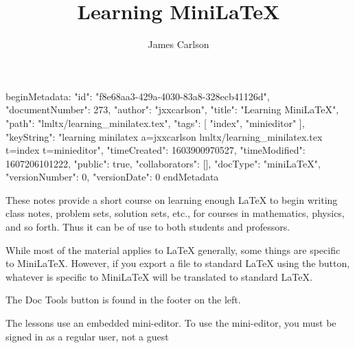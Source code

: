 beginMetadata:
{
    "id": "f8e68aa3-429a-4030-83a8-328ecb41126d",
    "documentNumber": 273,
    "author": "jxxcarlson",
    "title": "Learning MiniLaTeX",
    "path": "lmltx/learning_minilatex.tex",
    "tags": [
        "index",
        "minieditor"
    ],
    "keyString": "learning minilatex a=jxxcarlson lmltx/learning_minilatex.tex t=index t=minieditor",
    "timeCreated": 1603900970527,
    "timeModified": 1607206101222,
    "public": true,
    "collaborators": [],
    "docType": "miniLaTeX",
    "versionNumber": 0,
    "versionDate": 0
}
endMetadata
\title{Learning MiniLaTeX}

\author{James Carlson}


\maketitle



These notes  provide a short course on learning enough LaTeX to begin writing class notes, problem sets, solution sets, etc., for courses in mathematics, physics, and so forth.  Thus it can be of use to both students and professors.

While most of the material applies to LaTeX generally, some things are specific to MiniLaTeX. However, if you export a file to standard LaTeX using the  button, whatever is specific to MiniLaTeX will be translated to standard LaTeX.  

The Doc Tools button is found in the footer on the left.



 The lessons use an embedded mini-editor.  To use the mini-editor, you must be signed in as a regular user, not a guest







